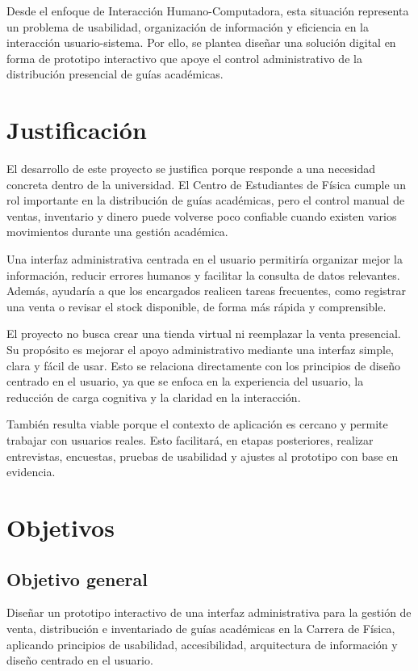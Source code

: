 \documentclass[12pt,letterpaper]{article}
\begin{document}
Desde el enfoque de Interacción Humano-Computadora, esta situación representa un problema de usabilidad, organización de información y eficiencia en la interacción usuario-sistema. Por ello, se plantea diseñar una solución digital en forma de prototipo interactivo que apoye el control administrativo de la distribución presencial de guías académicas.

\section{Justificación}

El desarrollo de este proyecto se justifica porque responde a una necesidad concreta dentro de la universidad. El Centro de Estudiantes de Física cumple un rol importante en la distribución de guías académicas, pero el control manual de ventas, inventario y dinero puede volverse poco confiable cuando existen varios movimientos durante una gestión académica.

Una interfaz administrativa centrada en el usuario permitiría organizar mejor la información, reducir errores humanos y facilitar la consulta de datos relevantes. Además, ayudaría a que los encargados realicen tareas frecuentes, como registrar una venta o revisar el stock disponible, de forma más rápida y comprensible.

El proyecto no busca crear una tienda virtual ni reemplazar la venta presencial. Su propósito es mejorar el apoyo administrativo mediante una interfaz simple, clara y fácil de usar. Esto se relaciona directamente con los principios de diseño centrado en el usuario, ya que se enfoca en la experiencia del usuario, la reducción de carga cognitiva y la claridad en la interacción.

También resulta viable porque el contexto de aplicación es cercano y permite trabajar con usuarios reales. Esto facilitará, en etapas posteriores, realizar entrevistas, encuestas, pruebas de usabilidad y ajustes al prototipo con base en evidencia.

\section{Objetivos}

\subsection{Objetivo general}

Diseñar un prototipo interactivo de una interfaz administrativa para la gestión de venta, distribución e inventariado de guías académicas en la Carrera de Física, aplicando principios de usabilidad, accesibilidad, arquitectura de información y diseño centrado en el usuario.
\end{document}

